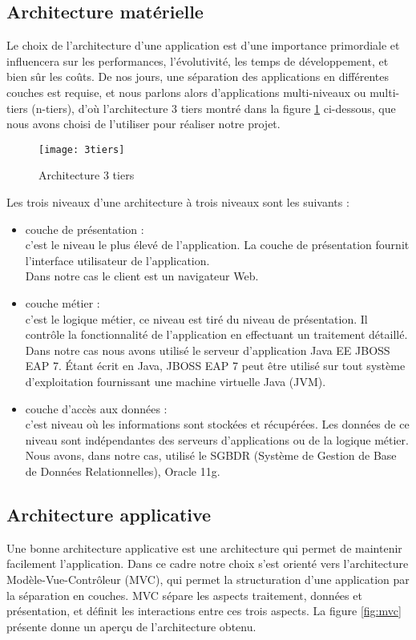 \subsection{Architecture matérielle}
Le choix de l’architecture d’une application est d’une importance primordiale et influencera sur les performances, l'évolutivité, les temps de développement, et bien sûr les coûts. De nos jours, une séparation des applications en différentes couches est requise, et nous parlons alors d’applications multi-niveaux ou multi-tiers (n-tiers), d’où l’architecture 3 tiers montré dans la figure \ref{fig:architecture} \cite{3tiers} ci-dessous, que nous avons choisi de l’utiliser pour réaliser notre projet.
\begin{figure}[htpb]
\centering
    \texttt{[image: 3tiers]}
    \caption{Architecture 3 tiers}
    \label{fig:architecture}
\end{figure}
\newpage
Les trois niveaux d'une architecture à trois niveaux sont les suivants :
\begin{itemize}
    \item couche de présentation : \\
    c'est le niveau le plus élevé de l'application. La couche de présentation fournit l'interface utilisateur de l'application. \\
     Dans notre cas le client est un navigateur Web.
    \item couche métier : \\
     c'est le logique métier, ce niveau est tiré du niveau de présentation. Il contrôle la fonctionnalité de l'application en effectuant un traitement détaillé. \\
     Dans notre cas nous avons utilisé le serveur d’application Java EE JBOSS EAP 7. Étant écrit en Java, JBOSS EAP 7 peut être utilisé sur tout système d’exploitation fournissant une machine virtuelle Java (JVM).
    \item couche d'accès aux données : \\
    c'est niveau où les informations sont stockées et récupérées. Les données de ce niveau sont indépendantes des serveurs d'applications ou de la logique métier. \\
    Nous avons, dans notre cas, utilisé le SGBDR (Système de Gestion de Base de Données Relationnelles), Oracle 11g.
\end{itemize}

\subsection{Architecture applicative}
Une bonne architecture applicative est une architecture qui permet de maintenir facilement l'application. Dans ce cadre notre choix s’est orienté vers l’architecture Modèle-Vue-Contrôleur (MVC), qui permet la structuration d'une application par la séparation en couches. MVC sépare les aspects traitement, données et présentation, et définit les interactions entre ces trois aspects. La figure \ref{fig:mvc} \cite{mvc} présente donne un aperçu de l’architecture obtenu.

